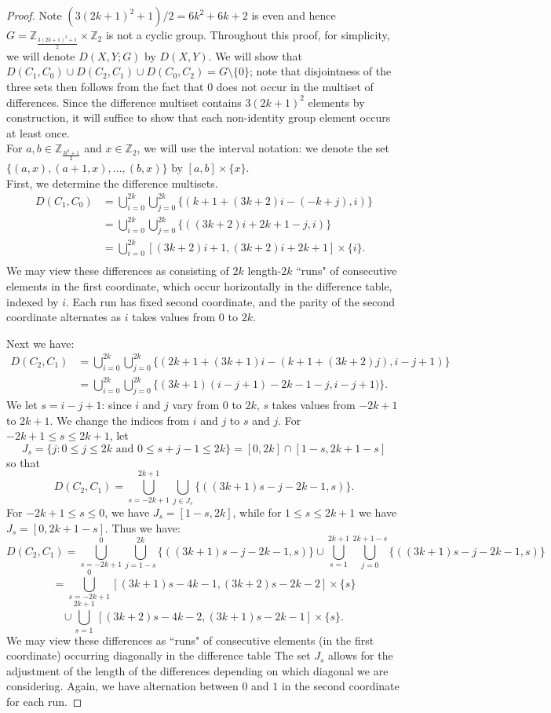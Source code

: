 \documentclass[12pt, a4paper]{article}
\theoremstyle{definition}
\begin{document}
\begin{proof}
Note $(3(2k+1)^2+1)/2=6k^2+6k+2$ is even and hence $G=\mathbb{Z}_{\frac{3(2k+1)^2+1}{2}}\times\mathbb{Z}_2$ is not a cyclic group.  
Throughout this proof, for simplicity, we will denote $D(X,Y; G)$ by $D(X,Y)$. We will show that $D(C_1,C_0) \cup D(C_2,C_1) \cup D(C_0,C_2)=G \setminus \{0\}$; note that disjointness of the three sets then follows from the fact that $0$ does not occur in the multiset of differences.  Since the difference multiset contains $3(2k+1)^2$ elements by construction, it will suffice to show that each non-identity group element occurs at least once.\\
For $a, b \in \mathbb{Z}_{\frac{3l^2+1}{2}}$ and $x \in \mathbb{Z}_2$, we will use the interval notation: we denote the set $\{(a,x), (a+1,x), \ldots, (b,x)\}$ by $[a,b]\times \{x\}$. \\
First, we determine the difference multisets. 
\begin{align*}
D  (C_1,C_0) &= \bigcup_{i=0}^{2k}\bigcup_{j=0}^{2k}\{(k+1+(3k+2)i-(-k+j),i)\}\\
&= \bigcup_{i=0}^{2k}\bigcup_{j=0}^{2k}\{((3k+2)i+2k+1-j,i)\}\\
&= \bigcup_{i=0}^{2k}[(3k+2)i+1,(3k+2)i+2k+1]\times \{i\}.\\
\end{align*}
We may view these differences as consisting of $2k$ length-$2k$ ``runs" of consecutive elements in the first coordinate, which occur horizontally in the difference table, indexed by $i$. Each run has fixed second coordinate, and the parity of the second coordinate alternates as $i$ takes values from $0$ to $2k$.

Next we have:
\begin{align*}
D(C_2,C_1) &= \bigcup_{i=0}^{2k}\bigcup_{j=0}^{2k}\{(2k+1+(3k+1)i-(k+1+(3k+2)j),i-j+1)\}\\
&= \bigcup_{i=0}^{2k}\bigcup_{j=0}^{2k}\{(3k+1)(i-j+1)-2k-1-j,i-j+1)\}.
\end{align*}
We let $s = i-j+1$: since $i$ and $j$ vary from $0$ to $2k$, $s$ takes values from  $-2k+1$ to $2k+1$.  We change the indices from $i$ and $j$ to $s$ and $j$.  For $-2k+1 \leq s \leq 2k+1$, let  $$J_s=\{j: 0 \leq j \leq 2k \mbox{ and } 0 \leq s+j-1 \leq 2k\}=[0,2k] \cap [1-s,2k+1-s]$$
so that
$$D  (C_2,C_1) = \bigcup_{s=-2k+1}^{2k+1}\bigcup_{j \in J_s} \{((3k+1)s-j-2k-1,s)\}.$$
For $-2k+1 \leq s \leq 0$, we have $J_s=[1-s,2k]$, while for $1 \leq s \leq 2k+1$ we have $J_s=[0,2k+1-s].$  Thus we have:
\[ D  (C_2,C_1) = \bigcup_{s=-2k+1}^{0}
\bigcup_{j = 1-s}^{2k} \{((3k+1)s-j-2k-1,s)\}
\cup\bigcup_{s=1}^{2k+1}\bigcup_{j =0}^{2k+1-s} 
\{((3k+1)s-j-2k-1,s)\}\]
\[= \bigcup_{s=-2k+1}^{0}
[(3k+1)s-4k-1,(3k+2)s-2k-2]\times \{s\}\]\[\cup\bigcup_{s=1}^{2k+1}
[(3k+2)s-4k-2,(3k+1)s-2k-1]\times \{s\}.\]
We may view these differences as ``runs" of consecutive elements (in the first coordinate) occurring diagonally in the difference table The set $J_s$ allows for the adjustment of the length of the differences depending on which diagonal we are considering. Again, we have alternation between $0$ and $1$ in the second coordinate for each run.


\end{proof}
\end{document}
